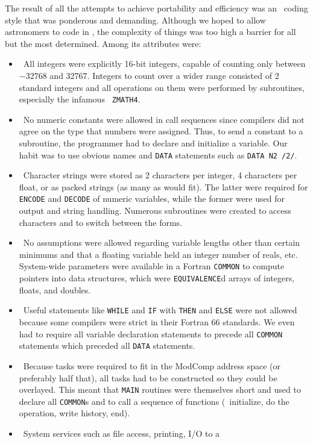 The result of all the attempts to achieve portability and efficiency
was an \AIPS\ coding style that was ponderous and demanding.  Although
we hoped to allow astronomers to code in \AIPS, the complexity of
things was too high a barrier for all but the most determined.  Among
its attributes were:
\begin{itemize}
\item\ All integers were explicitly 16-bit integers, capable of
counting only between $-32768$ and 32767.  Integers to count over a
wider range consisted of 2 standard integers and all operations on
them were performed by subroutines, especially the infamous \hbox{{\tt
ZMATH4}}.
\item\ No numeric constants were allowed in call sequences since
compilers did not agree on the type that numbers were assigned.  Thus,
to send a constant to a subroutine, the programmer had to declare and
initialize a variable.  Our habit was to use obvious names and
{\tt DATA} statements such as {\tt DATA N2 /2/}.
\item\ Character strings were stored as 2 characters per integer, 4
characters per float, or as packed strings (as many as would fit).
The latter were required for {\tt ENCODE} and {\tt DECODE} of numeric
variables, while the former were used for output and string handling.
Numerous subroutines were created to access characters and to switch
between the forms.
\item\ No assumptions were allowed regarding variable lengths other
than certain minimums and that a floating variable held an integer
number of reals, etc.  System-wide parameters were available in a
Fortran {\tt COMMON} to compute pointers into data structures, which
were {\tt EQUIVALENCE}d arrays of integers, floats, and doubles.
\item\ Useful statements like {\tt WHILE} and {\tt IF} with {\tt THEN}
and {\tt ELSE} were not allowed because some compilers were strict in
their Fortran 66 standards.  We even had to require all variable
declaration statements to precede all {\tt COMMON} statements which
preceded all {\tt DATA} statements.
\item\ Because tasks were required to fit in the ModComp address space
(or preferably half that), all tasks had to be constructed so they
could be overlayed.  This meant that {\tt MAIN} routines were
themselves short and used to declare all {\tt COMMON}s and to call a
sequence of functions (\ie\ initialize, do the operation, write
history, end).
\item\ System services such as file access, printing, I/O to a

\end{itemize}
